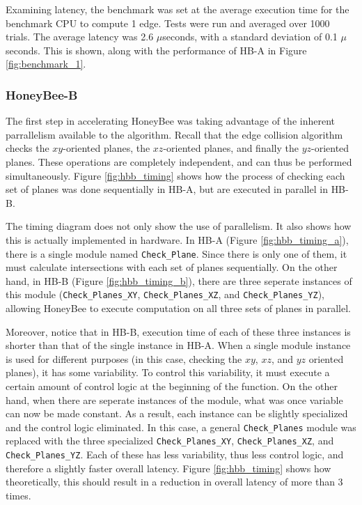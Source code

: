         Examining latency, the benchmark was set at the average execution time for the benchmark CPU to compute 1 edge. Tests were run and averaged over 1000 trials. The average latency was 2.6 $\mu$seconds, with a standard deviation of 0.1 $\mu$seconds. This is shown, along with the performance of \gls{HB-A} in Figure \ref{fig:benchmark_1}.

        

    \subsubsection{HoneyBee-B}
        The first step in accelerating HoneyBee was taking advantage of the inherent parrallelism available to the algorithm. Recall that the edge collision algorithm checks the $xy$-oriented planes, the $xz$-oriented planes, and finally the $yz$-oriented planes. These operations are completely independent, and can thus be performed simultaneously. Figure \ref{fig:hbb_timing} shows how the process of checking each set of planes was done sequentially in \gls{HB-A}, but are executed in parallel in \gls{HB-B}.

        

        The timing diagram does not only show the use of parallelism. It also shows how this is actually implemented in hardware. In \gls{HB-A} (Figure \ref{fig:hbb_timing_a}), there is a single module named \texttt{Check\_Plane}. Since there is only one of them, it must calculate intersections with each set of planes sequentially. On the other hand, in \gls{HB-B} (Figure \ref{fig:hbb_timing_b}), there are three seperate instances of this module (\texttt{Check\_Planes\_XY}, \texttt{Check\_Planes\_XZ}, and \texttt{Check\_Planes\_YZ}), allowing HoneyBee to execute computation on all three sets of planes in parallel. 

        Moreover, notice that in \gls{HB-B}, execution time of each of these three instances is shorter than that of the single instance in \gls{HB-A}. When a single module instance is used for different purposes (in this case, checking the $xy$, $xz$, and $yz$ oriented planes), it has some variability. To control this variability, it must execute a certain amount of control logic at the beginning of the function. On the other hand, when there are seperate instances of the module, what was once variable can now be made constant. As a result, each instance can be slightly specialized and the control logic eliminated. In this case, a general \texttt{Check\_Planes} module was replaced with the three specialized \texttt{Check\_Planes\_XY}, \texttt{Check\_Planes\_XZ}, and \texttt{Check\_Planes\_YZ}. Each of these has less variability, thus less control logic, and therefore a slightly faster overall latency. Figure \ref{fig:hbb_timing} shows how theoretically, this should result in a reduction in overall latency of more than 3 times.\\

